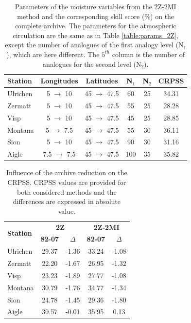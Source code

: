\documentclass[hess]{copernicus}
\begin{document}
\begin{table}[htb]
	\caption{Parameters of the moisture variables from the 2Z-2MI method and the corresponding skill score (\%) on the complete archive. The parameters for the atmospheric circulation are the same as in Table \ref{table:params_2Z}, except the number of analogues of the first analogy level (N$_{1}$), which are here different. The $5^{th}$ column is the number of analogues for the second level (N$_{2}$).}
	\begin{center}
		\begin{tabular}{l c c c c c }
			\hline
			\textbf{Station} & \textbf{Longitudes} & \textbf{Latitudes} & \textbf{N$_{1}$} & \textbf{N$_{2}$} & \textbf{CRPSS} \\
			\hline
			Ulrichen & 5 $\rightarrow$ 10 & 45 $\rightarrow$ 47.5 & 60 & 25 & 34.31 \\
			Zermatt & 5 $\rightarrow$ 10 & 45 $\rightarrow$ 47.5 & 55 & 25 & 28.28 \\
			Visp & 5 $\rightarrow$ 10 & 45 $\rightarrow$ 47.5 & 45 & 25 & 28.85 \\
			Montana & 5 $\rightarrow$ 7.5 & 45 $\rightarrow$ 47.5 & 55 & 30 & 36.11 \\
			Sion & 5 $\rightarrow$ 10 & 45 $\rightarrow$ 47.5 & 90 & 30 & 31.16 \\
			Aigle & 7.5 $\rightarrow$ 7.5 & 45 $\rightarrow$ 47.5 & 100 & 35 & 35.82 \\ 
			\hline
		\end{tabular}
	\end{center}
	\label{table:params_2Z-2MI}
\end{table}

\begin{table}[htb]
	\caption{Influence of the archive reduction on the CRPSS. CRPSS values are provided for both considered methods and the differences are expressed in absolute value.}
	\begin{center}
		\begin{tabular}{l c c c c }
			\hline
			\multirow{2}{*}{\textbf{Station}} & \multicolumn{2}{c}{\textbf{2Z}} & \multicolumn{2}{c}{\textbf{2Z-2MI}} \\
			& \textbf{82-07} & \textbf{$\Delta$} & \textbf{82-07} & \textbf{$\Delta$} \\ 
			\hline
			Ulrichen & 29.37 & -1.36 & 33.24 & -1.08 \\
			Zermatt & 22.20 & -1.67 & 26.95 & -1.32 \\
			Visp & 23.23 & -1.89 & 27.77 & -1.08 \\
			Montana & 30.79 & -1.76 & 34.77 & -1.34 \\
			Sion & 24.78 & -1.45 & 29.36 & -1.80 \\
			Aigle & 30.57 & -0.01 & 35.95 & 0.13 \\ 
			\hline
		\end{tabular}
	\end{center}
	\label{table:loss_reduction}
\end{table}
\end{document}
